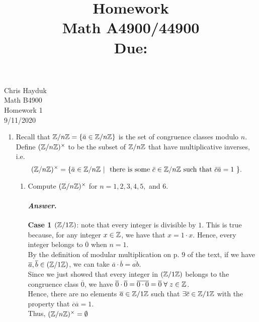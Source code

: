 \documentclass[11pt, reqno]{amsart}
\title[Homework \HW]{Homework \HW \\
Math A4900/44900\\
\small Due: \DUE}
\author{}
\theoremstyle{plain}
\theoremstyle{definition}
\theoremstyle{example}
\newenvironment{ans}{\color{black}\medskip \paragraph*{\emph{Answer}.}}{\hfill \break  $~\!\!$ \dotfill \medskip }
\def\ZZn{\ZZ/n\ZZ}
\def\HW{1}
\def\DUE{9/11/2020}
\begin{document}
\begin{flushright}
Chris Hayduk\\
Math B4900\\
Homework \HW\\
\DUE
\end{flushright}


\begin{enumerate}[1.]
\item Recall that  $\ZZn = \{ \bar{a} \in  \ZZn \}$ is the set of congruence classes modulo $n$.  Define  $(\mathbb{Z}/n\mathbb{Z})^\times$ to be the subset of $\mathbb{Z}/n\mathbb{Z}$ that have multiplicative inverses, i.e.\
$$(\ZZ/n\ZZ)^\times = \{ \bar{a} \in \ZZ/n\ZZ ~|~ \text{ there is some $\bar{c} \in \ZZn$ such that $\bar{c} \bar{a} = 1$ }\}.$$

\begin{enumerate}
\item Compute $(\mathbb{Z}/n\mathbb{Z})^\times$ for $n = 1, 2, 3, 4, 5,$ and $6$. 
	
\begin{ans}
\textbf{Case 1 $(\mathbb{Z}/1\mathbb{Z})$}: note that every integer is divisible by $1$. This is true because, for any integer $x \in \mathbb{Z}$, we have that $x = 1 \cdot x$. Hence, every integer belongs to $\overline{0}$ when $n = 1$.\\

By the definition of modular multiplication on p. 9 of the text, if we have $\overline{a}, \overline{b} \in (\mathbb{Z}/1\mathbb{Z})$, we can take $\overline{a} \cdot \overline{b} = \overline{ab}$.\\

Since we just showed that every integer in $(\mathbb{Z}/1\mathbb{Z})$ belongs to the congruence class $\overline{0}$, we have $\overline{0} \cdot \overline{0} = \overline{0 \cdot 0} = \overline{0} \; \forall \; z \in \mathbb{Z}$.\\

Hence, there are no elements $\overline{a} \in \mathbb{Z}/1\mathbb{Z}$ such that $\exists \overline{c} \in \mathbb{Z}/1\mathbb{Z}$ with the property that $\overline{c}\overline{a} = 1$.\\

Thus, $(\mathbb{Z}/n\mathbb{Z})^{\times} = \emptyset$\\


\end{ans}
\end{enumerate}
\end{enumerate}
\end{document}
